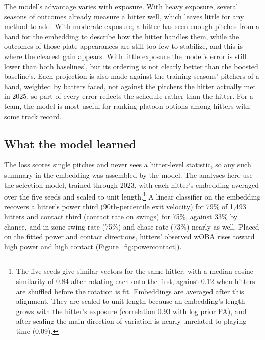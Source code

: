 \documentclass[11pt,letterpaper]{article}
\let\oldsubsection\subsection
\renewcommand\subsection{\FloatBarrier\oldsubsection}
\begin{document}
The model's advantage varies with exposure. With heavy exposure, several seasons of outcomes already measure a hitter well, which leaves little for any method to add. With moderate exposure, a hitter has seen enough pitches from a hand for the embedding to describe how the hitter handles them, while the outcomes of those plate appearances are still too few to stabilize, and this is where the clearest gain appears. With little exposure the model's error is still lower than both baselines', but its ordering is not clearly better than the boosted baseline's. Each projection is also made against the training seasons' pitchers of a hand, weighted by batters faced, not against the pitchers the hitter actually met in 2025, so part of every error reflects the schedule rather than the hitter. For a team, the model is most useful for ranking platoon options among hitters with some track record.

\subsection{What the model learned}
\label{sec:embedding}

The loss scores single pitches and never sees a hitter-level statistic, so any such summary in the embedding was assembled by the model. The analyses here use the selection model, trained through 2023, with each hitter's embedding averaged over the five seeds and scaled to unit length.\footnote{The five seeds give similar vectors for the same hitter, with a median cosine similarity of 0.84 after rotating each onto the first, against 0.12 when hitters are shuffled before the rotation is fit. Embeddings are averaged after this alignment. They are scaled to unit length because an embedding's length grows with the hitter's exposure (correlation 0.93 with log prior PA), and after scaling the main direction of variation is nearly unrelated to playing time (0.09).} A linear classifier on the embedding recovers a hitter's power third (90th-percentile exit velocity) for 79\% of 1,493 hitters and contact third (contact rate on swings) for 75\%, against 33\% by chance, and in-zone swing rate (75\%) and chase rate (73\%) nearly as well. Placed on the fitted power and contact directions, hitters' observed wOBA rises toward high power and high contact (Figure~\ref{fig:powercontact}).
\end{document}
